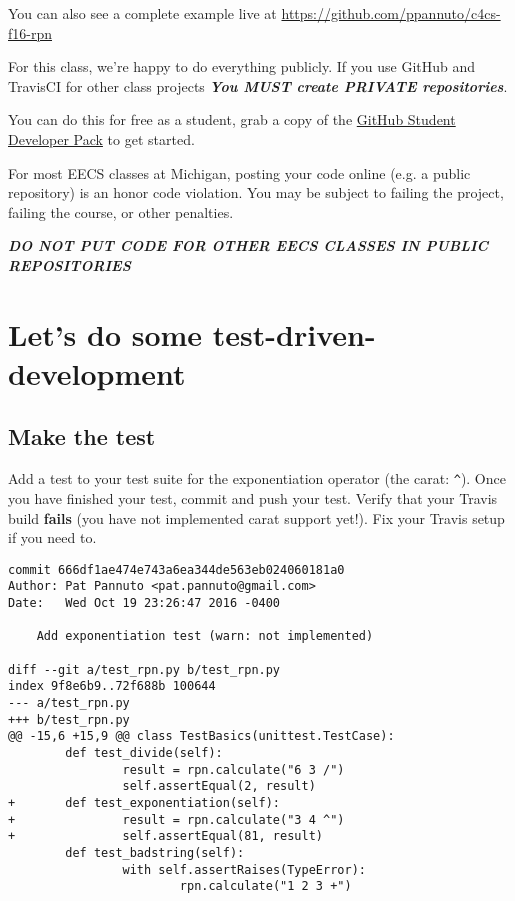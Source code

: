 \documentclass{article}
\begin{document}
You can also see a complete example live at
\url{https://github.com/ppannuto/c4cs-f16-rpn}

\vfill

\begin{mdframed}\centering
For this class, we're happy to do everything publicly. If you use GitHub and
TravisCI for other class projects
\textbf{\emph{\large You MUST create PRIVATE repositories}}.

You can do this for free as a student, grab a copy of the
\href{https://education.github.com/pack}{GitHub Student Developer Pack} to get
started.

{\color{red}
  For most EECS classes at Michigan, posting your code online (e.g. a public
  repository) is an honor code violation. You may be subject to failing the
  project, failing the course, or other penalties.

  \textbf{\emph{\Large DO NOT PUT CODE FOR OTHER EECS CLASSES IN PUBLIC REPOSITORIES}}
}
\end{mdframed}










\newpage

\section{Let's do some test-driven-development}

\subsection{Make the test}
Add a test to your test suite for the exponentiation operator (the carat:
\texttt{\^{}}). Once you have finished your test, commit and push your test.
Verify that your Travis build \textbf{fails} (you have not implemented carat
support yet!). Fix your Travis setup if you need to.

{\color{violet}
\begin{lstlisting}
commit 666df1ae474e743a6ea344de563eb024060181a0
Author: Pat Pannuto <pat.pannuto@gmail.com>
Date:   Wed Oct 19 23:26:47 2016 -0400

    Add exponentiation test (warn: not implemented)

diff --git a/test_rpn.py b/test_rpn.py
index 9f8e6b9..72f688b 100644
--- a/test_rpn.py
+++ b/test_rpn.py
@@ -15,6 +15,9 @@ class TestBasics(unittest.TestCase):
        def test_divide(self):
                result = rpn.calculate("6 3 /")
                self.assertEqual(2, result)
+       def test_exponentiation(self):
+               result = rpn.calculate("3 4 ^")
+               self.assertEqual(81, result)
        def test_badstring(self):
                with self.assertRaises(TypeError):
                        rpn.calculate("1 2 3 +")
\end{lstlisting}
}
\end{document}
